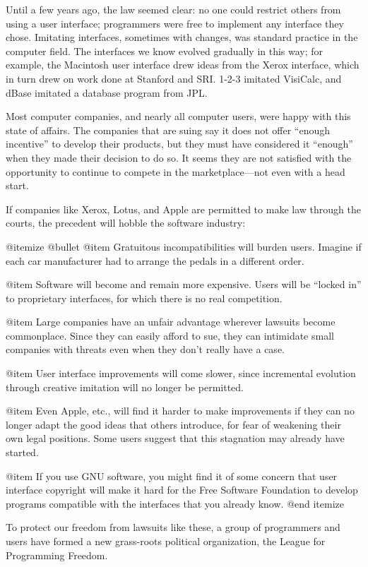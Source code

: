 Until a few years ago, the law seemed clear: no one could restrict
others from using a user interface; programmers were free to implement
any interface they chose.  Imitating interfaces, sometimes with changes,
was standard practice in the computer field.  The interfaces we know
evolved gradually in this way; for example, the Macintosh user interface
drew ideas from the Xerox interface, which in turn drew on work done at
Stanford and SRI.  1-2-3 imitated VisiCalc, and dBase imitated a
database program from JPL.

Most computer companies, and nearly all computer users, were happy with
this state of affairs.  The companies that are suing say it does not
offer ``enough incentive'' to develop their products, but they must have
considered it ``enough'' when they made their decision to do so.  It
seems they are not satisfied with the opportunity to continue to compete
in the marketplace---not even with a head start.

If companies like Xerox, Lotus, and Apple are permitted to make law
through the courts, the precedent will hobble the software industry:

@itemize @bullet
@item
Gratuitous incompatibilities will burden users.  Imagine if each
car manufacturer had to arrange the pedals in a different order.

@item
Software will become and remain more expensive.  Users will be
``locked in'' to proprietary interfaces, for which there is no real
competition.

@item
Large companies have an unfair advantage wherever lawsuits become
commonplace.  Since they can easily afford to sue, they can intimidate
small companies with threats even when they don't really have a case.

@item
User interface improvements will come slower, since incremental
evolution through creative imitation will no longer be permitted.

@item
Even Apple, etc., will find it harder to make improvements if
they can no longer adapt the good ideas that others introduce, for
fear of weakening their own legal positions.  Some users suggest that
this stagnation may already have started.

@item
If you use GNU software, you might find it of some concern that user
interface copyright will make it hard for the Free Software Foundation
to develop programs compatible with the interfaces that you already
know.
@end itemize

To protect our freedom from lawsuits like these, a group of programmers
and users have formed a new grass-roots political organization, the
League for Programming Freedom.

